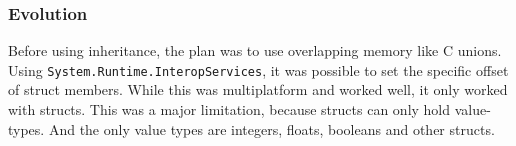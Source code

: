\subsubsection{Evolution}
Before using inheritance, the plan was to use overlapping memory like C unions. 
Using \verb|System.|\verb|Runtime.|\verb|InteropServices|, it was possible to set the specific offset of struct members.
While this was multiplatform and worked well, it only worked with structs.
This was a major limitation, because structs can only hold value-types.
And the only value types are integers, floats, booleans and other structs.


